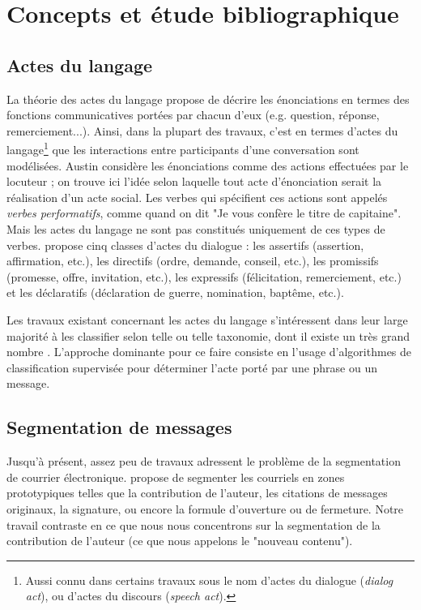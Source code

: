 
\chapter{Concepts et étude bibliographique}

\label{ch:background_and_related_work}

\section{Actes du langage}

La théorie des actes du langage \cite{austin1975things} propose de décrire les énonciations en termes des fonctions communicatives portées par chacun d'eux (e.g. question, réponse, remerciement...). Ainsi, dans la plupart des travaux, c'est en termes d'actes du langage\footnote{Aussi connu dans certains travaux sous le nom d'actes du dialogue (\textit{dialog act}), ou d'actes du discours (\textit{speech act}).} que les interactions entre participants d'une conversation sont modélisées. Austin considère les énonciations comme des actions effectuées par le locuteur ; on trouve ici l'idée selon laquelle tout acte d'énonciation serait la réalisation d'un acte social. Les verbes qui spécifient ces actions sont appelés \textit{verbes performatifs}, comme quand on dit "Je vous confère le titre de capitaine". Mais les actes du langage ne sont pas constitués uniquement de ces types de verbes. \cite{searle1976taxonomy} propose cinq classes d'actes du dialogue : les assertifs (assertion, affirmation, etc.), les directifs (ordre, demande, conseil, etc.), les promissifs (promesse, offre, invitation, etc.), les expressifs (félicitation, remerciement, etc.) et les déclaratifs (déclaration de guerre, nomination, baptême, etc.).

Les travaux existant concernant les actes du langage s'intéressent dans leur large majorité à les classifier selon telle ou telle taxonomie, dont il existe un très grand nombre \cite{traum200020}. L'approche dominante pour ce faire consiste en l'usage d'algorithmes de classification supervisée \cite{joty:2013:sigdial} pour déterminer l'acte porté par une phrase ou un message.

\section{Segmentation de messages}

Jusqu'à présent, assez peu de travaux adressent le problème de la segmentation de courrier électronique. \cite{lampert:2009:emnlp} propose de segmenter les courriels en zones prototypiques telles que la contribution de l'auteur, les citations de messages originaux, la signature, ou encore la formule d'ouverture ou de fermeture. Notre travail contraste en ce que nous nous concentrons sur la segmentation de la contribution de l'auteur (ce que nous appelons le "nouveau contenu").

